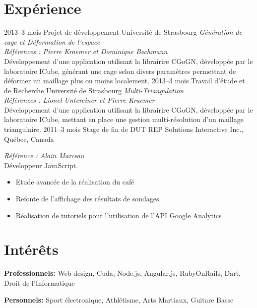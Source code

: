 \documentclass[]{friggeri-cv} %
\begin{document}
\section{Expérience}

\begin{entrylist}
\entry
{2013--3 mois}
{Projet de développement}
{Université de Strasbourg}
{\emph{Génération de cage et Déformation de l'espace \\ Références : Pierre Kraemer et Dominique Bechmann} \\
Développement d'une application utilisant la librairire CGoGN, développée par le laboratoire ICube, générant une cage selon divers paramètres permettant de déformer un maillage plus ou moins localement.}
\entry
{2013--3 mois}
{Travail d'étude et de Recherche}
{Université de Strasbourg}
{\emph{Multi-Triangulation\\Références : Lionel Untereiner et Pierre Kraemer} \\
Développement d'une application utilisant la librairire CGoGN, développée par le laboratoire ICube, mettant en place une gestion multi-résolution d'un maillage triangulaire.}
\entry
{2011--3 mois}
{Stage de fin de DUT}
{REP Solutions Interactive Inc., Québec, Canada}
{\emph{Référence : Alain Marceau} \\
Développeur JavaScript.
\begin{itemize}
\item Etude avancée de la réalisation du café
\item Refonte de l'affichage des résultats de sondages
\item Réalisation de tutoriels pour l'utilisation de l'API Google Analytics
\end{itemize}}
\end{entrylist}


\section{Intérêts}

\textbf{Professionnels:} Web design, Cuda, Node.js, Angular.js, RubyOnRails, Dart, Droit de l'Informatique

\textbf{Personnels:} Sport électronique, Athlétisme, Arts Martiaux, Guitare Basse

\end{document}
